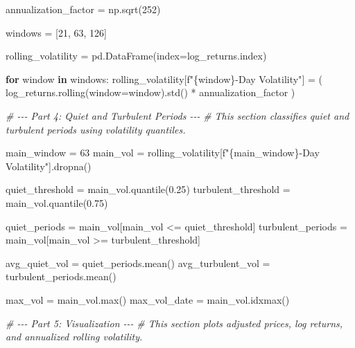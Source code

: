 \documentclass[
  11pt,
]{article}
\newenvironment{Shaded}{}{}
\newcommand{\BuiltInTok}[1]{\textcolor[rgb]{0.00,0.50,0.00}{#1}}
\newcommand{\CommentTok}[1]{\textcolor[rgb]{0.38,0.63,0.69}{\textit{#1}}}
\newcommand{\ControlFlowTok}[1]{\textcolor[rgb]{0.00,0.44,0.13}{\textbf{#1}}}
\newcommand{\DecValTok}[1]{\textcolor[rgb]{0.25,0.63,0.44}{#1}}
\newcommand{\FloatTok}[1]{\textcolor[rgb]{0.25,0.63,0.44}{#1}}
\newcommand{\KeywordTok}[1]{\textcolor[rgb]{0.00,0.44,0.13}{\textbf{#1}}}
\newcommand{\NormalTok}[1]{#1}
\newcommand{\OperatorTok}[1]{\textcolor[rgb]{0.40,0.40,0.40}{#1}}
\newcommand{\SpecialCharTok}[1]{\textcolor[rgb]{0.25,0.44,0.63}{#1}}
\newcommand{\SpecialStringTok}[1]{\textcolor[rgb]{0.73,0.40,0.53}{#1}}
\begin{document}
\begin{Shaded}
\begin{Highlighting}[]
\NormalTok{annualization\_factor }\OperatorTok{=}\NormalTok{ np.sqrt(}\DecValTok{252}\NormalTok{)}

\NormalTok{windows }\OperatorTok{=}\NormalTok{ [}\DecValTok{21}\NormalTok{, }\DecValTok{63}\NormalTok{, }\DecValTok{126}\NormalTok{]}

\NormalTok{rolling\_volatility }\OperatorTok{=}\NormalTok{ pd.DataFrame(index}\OperatorTok{=}\NormalTok{log\_returns.index)}

\ControlFlowTok{for}\NormalTok{ window }\KeywordTok{in}\NormalTok{ windows:}
\NormalTok{    rolling\_volatility[}\SpecialStringTok{f"}\SpecialCharTok{\{}\NormalTok{window}\SpecialCharTok{\}}\SpecialStringTok{{-}Day Volatility"}\NormalTok{] }\OperatorTok{=}\NormalTok{ (}
\NormalTok{        log\_returns.rolling(window}\OperatorTok{=}\NormalTok{window).std() }\OperatorTok{*}\NormalTok{ annualization\_factor}
\NormalTok{    )}


\CommentTok{\# {-}{-}{-} Part 4: Quiet and Turbulent Periods {-}{-}{-}}
\CommentTok{\# This section classifies quiet and turbulent periods using volatility quantiles.}

\NormalTok{main\_window }\OperatorTok{=} \DecValTok{63}
\NormalTok{main\_vol }\OperatorTok{=}\NormalTok{ rolling\_volatility[}\SpecialStringTok{f"}\SpecialCharTok{\{}\NormalTok{main\_window}\SpecialCharTok{\}}\SpecialStringTok{{-}Day Volatility"}\NormalTok{].dropna()}

\NormalTok{quiet\_threshold }\OperatorTok{=}\NormalTok{ main\_vol.quantile(}\FloatTok{0.25}\NormalTok{)}
\NormalTok{turbulent\_threshold }\OperatorTok{=}\NormalTok{ main\_vol.quantile(}\FloatTok{0.75}\NormalTok{)}

\NormalTok{quiet\_periods }\OperatorTok{=}\NormalTok{ main\_vol[main\_vol }\OperatorTok{\textless{}=}\NormalTok{ quiet\_threshold]}
\NormalTok{turbulent\_periods }\OperatorTok{=}\NormalTok{ main\_vol[main\_vol }\OperatorTok{\textgreater{}=}\NormalTok{ turbulent\_threshold]}

\NormalTok{avg\_quiet\_vol }\OperatorTok{=}\NormalTok{ quiet\_periods.mean()}
\NormalTok{avg\_turbulent\_vol }\OperatorTok{=}\NormalTok{ turbulent\_periods.mean()}

\NormalTok{max\_vol }\OperatorTok{=}\NormalTok{ main\_vol.}\BuiltInTok{max}\NormalTok{()}
\NormalTok{max\_vol\_date }\OperatorTok{=}\NormalTok{ main\_vol.idxmax()}


\CommentTok{\# {-}{-}{-} Part 5: Visualization {-}{-}{-}}
\CommentTok{\# This section plots adjusted prices, log returns, and annualized rolling volatility.}


\end{Highlighting}
\end{Shaded}
\end{document}
